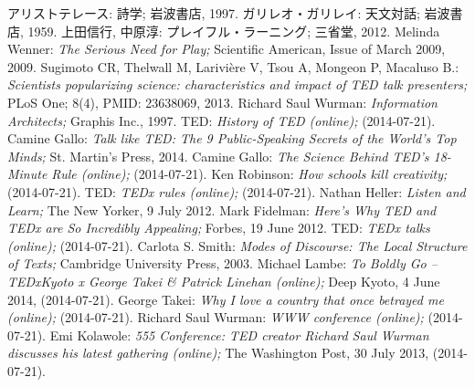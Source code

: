 \documentclass[submit,techreq,jkeyword,noauthor]{ipsj}
\begin{document}
\begin{thebibliography}{10}
 アリストテレース: 詩学; 岩波書店, 1997.
 ガリレオ・ガリレイ: 天文対話; 岩波書店, 1959.
 上田信行, 中原淳: プレイフル・ラーニング; 三省堂, 2012.
 Melinda Wenner: \textit{The Serious Need for Play;} Scientific American, Issue of March 2009, 2009.
 Sugimoto CR, Thelwall M, Larivière V, Tsou A, Mongeon P, Macaluso B.: \textit{Scientists popularizing science: characteristics and impact of TED talk presenters;} PLoS One; 8(4), PMID: 23638069, 2013. 
 Richard Saul Wurman: \textit{Information Architects;} Graphis Inc., 1997.
 TED: \textit{History of TED (online);}  (2014-07-21).
 Camine Gallo: \textit{Talk like TED: The 9 Public-Speaking Secrets of the World's Top Minds;} St. Martin's Press, 2014.
 Camine Gallo: \textit{The Science Behind TED's 18-Minute Rule (online);}  (2014-07-21).
 Ken Robinson: \textit{How schools kill creativity;}  (2014-07-21).
 TED: \textit{TEDx rules (online);}  (2014-07-21).
 Nathan Heller: \textit{Listen and Learn;} The New Yorker, 9 July 2012.
 Mark Fidelman: \textit{Here's Why TED and TEDx are So Incredibly Appealing;} Forbes, 19 June 2012.
 TED: \textit{TEDx talks  (online);}  (2014-07-21).
 Carlota S. Smith: \textit{Modes of Discourse: The Local Structure of Texts;} Cambridge University Press, 2003.
 Michael Lambe: \textit{To Boldly Go – TEDxKyoto x George Takei \& Patrick Linehan (online);} Deep Kyoto, 4 June 2014,  (2014-07-21).
 George Takei: \textit{Why I love a country that once betrayed me (online);}  (2014-07-21).
 Richard Saul Wurman: \textit{WWW conference (online);}  (2014-07-21).
 Emi Kolawole: \textit{555 Conference: TED creator Richard Saul Wurman discusses his latest gathering (online);} The Washington Post, 30 July 2013,  (2014-07-21).
\end{thebibliography}
\end{document}
